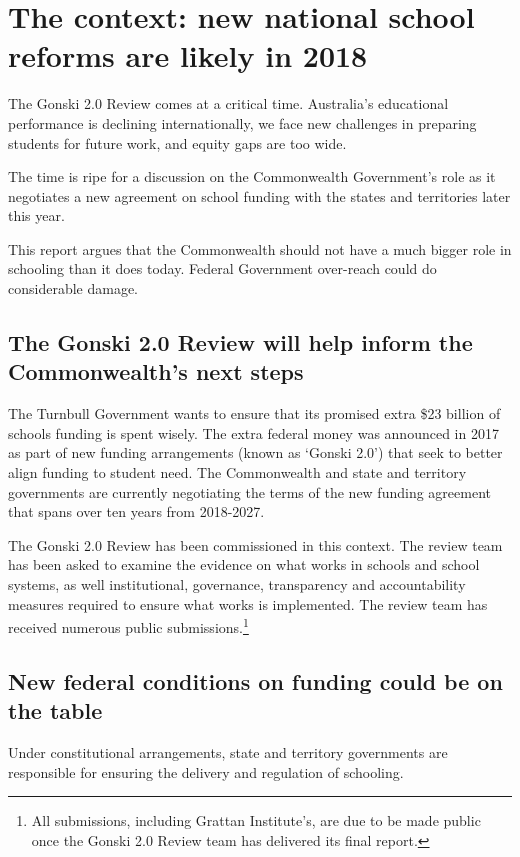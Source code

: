 \chapter{The context: new national school reforms are likely in 2018}\label{chap:National-reform-context}

The Gonski 2.0 Review comes at a critical time. Australia’s educational performance is declining internationally, we face new challenges in preparing students for future work, and equity gaps are too wide. 

The time is ripe for a discussion on the Commonwealth Government’s role as it negotiates a new agreement on school funding with the states and territories later this year. 

This report argues that the Commonwealth should not have a much bigger role in schooling than it does today. Federal Government over-reach could do considerable damage. 

\section{The Gonski 2.0 Review will help inform the Commonwealth's next steps}\label{sec:Commonwealth-next-steps}

The Turnbull Government wants to ensure that its promised extra \$23 billion of schools funding is spent wisely. The extra federal money was announced in 2017 as part of new funding arrangements (known as `Gonski 2.0') that seek to better align funding to student need. The Commonwealth and state and territory governments are currently negotiating the terms of the new funding agreement that spans over ten years from 2018-2027.

The Gonski 2.0 Review has been commissioned in this context. The review team has been asked to examine the evidence on what works in schools and school systems, as well institutional, governance, transparency and accountability measures required to ensure what works is implemented. The review team has received numerous public submissions.\footnote{All submissions, including Grattan Institute's, are due to be made public once the Gonski 2.0 Review team has delivered its final report.}

\section{New federal conditions on funding could be on the table}\label{sec:Commonwealth-influence}

Under constitutional arrangements, state and territory governments are responsible for ensuring the delivery and regulation of schooling.

